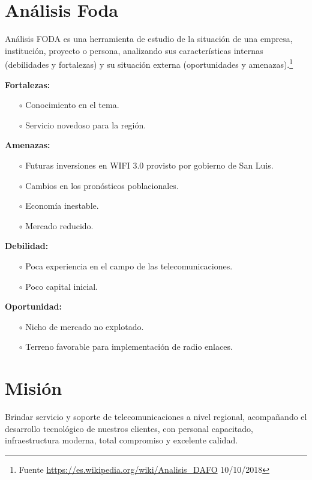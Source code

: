 \documentclass[12pt,a4paper]{book}
\begin{document}
\section{Análisis Foda}\label{sec_analisis_foda_Pnegocio}

\medskip

Análisis FODA es una herramienta de estudio de la situación de una empresa, institución, proyecto o persona, analizando sus características internas (debilidades y fortalezas) y su situación externa (oportunidades y amenazas).\footnote{Fuente \url{https://es.wikipedia.org/wiki/Analisis_DAFO} 10/10/2018}

\medskip

\noindent \textbf{Fortalezas:}
\begin{itemize}
\item[$\circ$] Conocimiento en el tema.
\item[$\circ$] Servicio novedoso para la región.
\end{itemize}

\medskip

\noindent \textbf{Amenazas:}
\begin{itemize}
\item[$\circ$] Futuras inversiones en WIFI 3.0 provisto por gobierno de San Luis.
\item[$\circ$] Cambios en los pronósticos poblacionales.
\item[$\circ$] Economía inestable.
\item[$\circ$] Mercado reducido.
\end{itemize}

\medskip 

\noindent \textbf{Debilidad:}
\begin{itemize}
\item[$\circ$] Poca experiencia en el campo de las telecomunicaciones.
\item[$\circ$] Poco capital inicial.
\end{itemize}

\medskip 

\noindent \textbf{Oportunidad:}
\begin{itemize}
\item[$\circ$] Nicho de mercado no explotado.
\item[$\circ$] Terreno favorable para implementación de radio enlaces.
\end{itemize}

\section{Misión}
Brindar servicio y soporte de telecomunicaciones a nivel regional, acompañando el desarrollo tecnológico de nuestros clientes, con personal capacitado, infraestructura moderna, total compromiso y excelente calidad.
\end{document}
